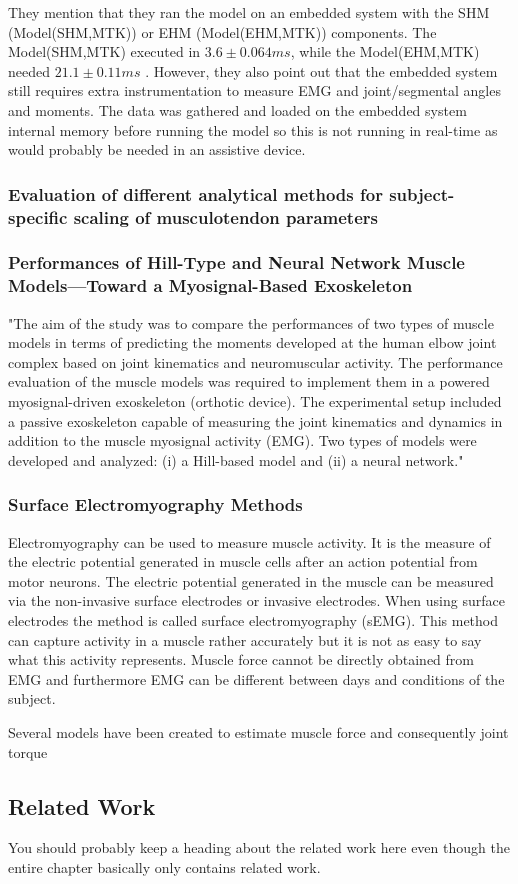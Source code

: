 They mention that they ran the model on an embedded system with the SHM (Model(SHM,MTK)) or EHM (Model(EHM,MTK)) components. 
The Model(SHM,MTK) executed in $3.6 \pm 0.064 ms$, while the Model(EHM,MTK) needed $21.1 \pm 0.11 ms$ \cite[p. 8]{Sartori2012}.
However, they also point out that the embedded system still requires extra instrumentation to measure EMG and joint/segmental angles and moments. The data was gathered and loaded on the embedded system internal memory before running the model so this is not running in real-time as would probably be needed in an assistive device.

\subsubsection{Evaluation of different analytical methods for subject-specific scaling of musculotendon parameters}

\subsubsection{Performances of Hill-Type and Neural Network Muscle
Models—Toward a Myosignal-Based Exoskeleton}

"The aim of the study was to compare the performances of two types of muscle models in terms of predicting the moments developed at the human elbow joint complex based on joint kinematics and neuromuscular activity. The performance evaluation of the muscle models was required to implement them in a powered myosignal-driven exoskeleton (orthotic device). The experimental setup included a passive exoskeleton capable of measuring the joint kinematics and dynamics in addition to the muscle myosignal activity (EMG). Two types of models were developed and analyzed: (i) a Hill-based model and (ii) a neural network." \cite[p. 1]{Rosen1999}

\subsubsection{Surface Electromyography Methods}
Electromyography can be used to measure muscle activity. 
It is the measure of the electric potential generated in muscle cells after an action potential from motor neurons. 
The electric potential generated in the muscle can be measured via the non-invasive surface electrodes or invasive electrodes. 
When using surface electrodes the method is called surface electromyography (sEMG). 
This method can capture activity in a muscle rather accurately but it is not as easy to say what this activity represents. 
Muscle force cannot be directly obtained from EMG and furthermore EMG can be different between days and conditions of the subject.

Several models have been created to estimate muscle force and consequently joint torque 

\subsection{Related Work}
You should probably keep a heading about the related work here even though the entire chapter basically only contains related work.
